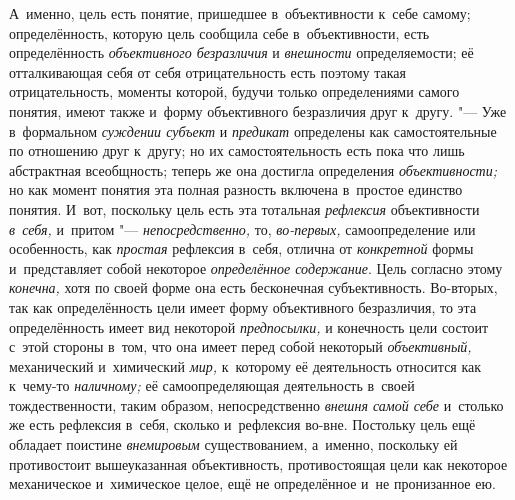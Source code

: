 А~именно, цель есть понятие, пришедшее в~объективности к~себе
самому; определённость, которую цель сообщила себе в~объективности, есть
определённость {\em объективного безразличия} и {\em внешности}
определяемости; её отталкивающая себя от себя отрицательность
есть поэтому такая отрицательность, моменты которой, будучи только
определениями самого понятия, имеют также и~форму объективного безразличия
друг к~другу. "--- Уже в~формальном
{\em суждении субъект} и {\em предикат} определены
как самостоятельные по отношению друг к~другу; но их самостоятельность есть
пока что лишь абстрактная всеобщность; теперь же она достигла определения
{\em объективности;} но
как момент понятия эта полная разность включена в~простое единство понятия.
И~вот, поскольку цель есть эта тотальная {\em рефлексия}
объективности {\em в~себя,} и~притом "--- {\em непосредственно,}
то, {\em во-первых,} самоопределение или особенность, как
{\em простая} рефлексия в~себя, отлична от {\em конкретной}
формы и~представляет собой некоторое {\em определённое содержание}.
Цель согласно этому {\em конечна,} хотя по
своей форме она есть бесконечная субъективность. Во-вторых, так как
определённость цели имеет форму объективного безразличия, то эта
определённость имеет вид некоторой {\em предпосылки,} и
конечность цели состоит с~этой стороны в~том, что она имеет перед собой
некоторый {\em объективный,} механический и~химический {\em мир,}
к~которому её деятельность относится как к~чему-то {\em наличному;} её
самоопределяющая деятельность в~своей тождественности, таким образом,
непосредственно {\em внешня самой себе}
и~столько же есть рефлексия в~себя, сколько и~рефлексия
во-вне. Постольку цель ещё обладает поистине {\em внемировым}
существованием, а~именно, поскольку ей противостоит вышеуказанная
объективность, противостоящая цели как некоторое механическое и~химическое
целое, ещё не определённое и~не пронизанное ею.


